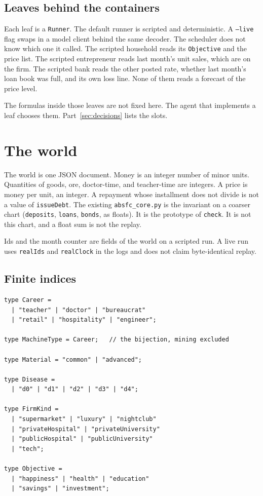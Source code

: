 \documentclass[11pt]{article}
\newenvironment{keep}{\noindent\begin{minipage}{\linewidth}}{\end{minipage}}
\begin{document}
\subsection{Leaves behind the containers}

Each leaf is a \texttt{Runner}. The default runner is scripted and
deterministic. A \texttt{--live} flag swaps in a model client behind the
same decoder. The scheduler does not know which one it called. The scripted
household reads its \texttt{Objective} and the price list. The scripted
entrepreneur reads last month's unit sales, which are on the firm. The
scripted bank reads the other posted rate, whether last month's loan book
was full, and its own loss line. None of them reads a forecast of the price
level.

The formulas inside those leaves are not fixed here. The agent that
implements a leaf chooses them. Part~\ref{sec:decisions} lists the slots.

\section{The world}
\label{sec:world}

The world is one JSON document. Money is an integer number of minor units.
Quantities of goods, ore, doctor-time, and teacher-time are integers.
A price is money per unit, an integer. A repayment whose installment does
not divide is not a value of \texttt{issueDebt}. The existing
\texttt{absfc\_core.py} is the invariant on a coarser chart
(\texttt{deposits}, \texttt{loans}, \texttt{bonds}, as floats). It is the
prototype of \texttt{check}. It is not this chart, and a float sum is not
the replay.

Ids and the month counter are fields of the world on a scripted run.
A live run uses \texttt{realIds} and \texttt{realClock} in the logs and
does not claim byte-identical replay.

\subsection{Finite indices}

\begin{keep}
\begin{lstlisting}
type Career =
  | "teacher" | "doctor" | "bureaucrat"
  | "retail" | "hospitality" | "engineer";

type MachineType = Career;   // the bijection, mining excluded

type Material = "common" | "advanced";

type Disease =
  | "d0" | "d1" | "d2" | "d3" | "d4";

type FirmKind =
  | "supermarket" | "luxury" | "nightclub"
  | "privateHospital" | "privateUniversity"
  | "publicHospital" | "publicUniversity"
  | "tech";

type Objective =
  | "happiness" | "health" | "education"
  | "savings" | "investment";
\end{lstlisting}
\end{keep}
\end{document}
